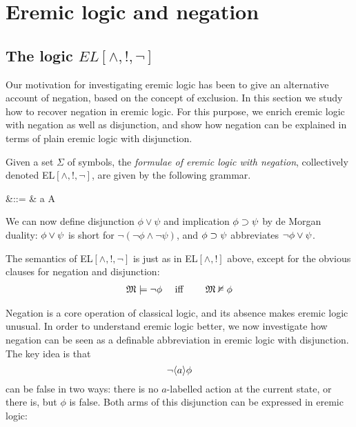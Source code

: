 \section{Eremic logic and negation}\label{ELAndNegation}

\subsection{The logic $EL[\land, !, \neg]$}

Our motivation for investigating eremic logic has been to give an
alternative account of negation, based on the concept of exclusion.
In this section we study how to recover negation in eremic logic. For
this purpose, we enrich eremic logic with negation as well as
disjunction, and show how negation can be explained in terms of plain
eremic logic with disjunction.

\begin{definition}
Given a set $\Sigma$ of symbols, the \emph{formulae of eremic logic
  with negation}, collectively denoted EL$[\land, !, \neg]$, are given
by the following grammar.

\begin{GRAMMAR}
  \phi 
     &\quad ::= \quad & 
   \top \fOr \bot \fOr \neg \phi \fOr \phi \land \psi \fOr \langle a \rangle \phi \fOr \fBang A 
\end{GRAMMAR}

\NI We can now define disjunction $\phi \lor \psi$ and implication
$\phi \supset \psi$ by de Morgan duality: $\phi \lor \psi$ is short
for $\neg (\neg \phi \land \neg \psi )$, and $\phi \supset \psi$  abbreviates
$\neg\phi \lor \psi$.
\end{definition}

The semantics of EL$[\land, !, \neg]$ is just as in EL$[\land, !]$
above, except for the obvious clauses for negation and disjunction:
\begin{eqnarray*}
\frak{M} \models \neg \phi &\quad\mbox{ iff }\quad& \frak{M} \nvDash \phi  
\end{eqnarray*}


Negation is a core operation of classical logic, and its absence makes
eremic logic unusual. In order to understand eremic logic better, we
now investigate how negation can be seen as a definable abbreviation
in eremic logic with disjunction. The key idea is that 
\[
   \neg \langle a \rangle \phi
\]
can be false in two ways: there is no $a$-labelled action at the
current state, or there is, but $\phi$ is false. Both arms of this
disjunction can be expressed in eremic logic:

